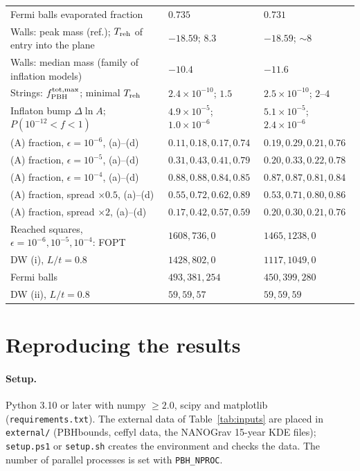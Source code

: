 \documentclass[aps,prd,onecolumn,superscriptaddress,nofootinbib,floatfix]{revtex4-2}
\newcommand{\fpbh}{f_{\rm PBH}}
\newcommand{\Treh}{T_{\rm reh}}
\newcommand{\code}[1]{\texttt{#1}}
\begin{document}
\begin{table}[htbp]
\begin{ruledtabular}
\begin{tabular}{lll}
Fermi balls evaporated fraction & $0.735$ & $0.731$ \\
Walls: peak mass (ref.); $\Treh$ of entry into the plane & $-18.59$; $8.3$ & $-18.59$; $\sim8$ \\
Walls: median mass (family of inflation models) & $-10.4$ & $-11.6$ \\
Strings: $\fpbh^{\rm tot,max}$; minimal $\Treh$ & $2.4\times10^{-10}$; $1.5$ & $2.5\times10^{-10}$; $2$--$4$ \\
Inflaton bump $\Delta\ln A$; $P(10^{-12}<f<1)$ & $4.9\times10^{-5}$; $1.0\times10^{-6}$ & $5.1\times10^{-5}$; $2.4\times10^{-6}$ \\
(A) fraction, $\epsilon=10^{-6}$, (a)--(d) & $0.11, 0.18, 0.17, 0.74$ & $0.19, 0.29, 0.21, 0.76$ \\
(A) fraction, $\epsilon=10^{-5}$, (a)--(d) & $0.31, 0.43, 0.41, 0.79$ & $0.20, 0.33, 0.22, 0.78$ \\
(A) fraction, $\epsilon=10^{-4}$, (a)--(d) & $0.88, 0.88, 0.84, 0.85$ & $0.87, 0.87, 0.81, 0.84$ \\
(A) fraction, spread $\times0.5$, (a)--(d) & $0.55, 0.72, 0.62, 0.89$ & $0.53, 0.71, 0.80, 0.86$ \\
(A) fraction, spread $\times2$, (a)--(d) & $0.17, 0.42, 0.57, 0.59$ & $0.20, 0.30, 0.21, 0.76$ \\
Reached squares, $\epsilon=10^{-6},10^{-5},10^{-4}$: FOPT & $1608, 736, 0$ & $1465, 1238, 0$ \\
\quad DW (i), $L/t=0.8$ & $1428, 802, 0$ & $1117, 1049, 0$ \\
\quad Fermi balls & $493, 381, 254$ & $450, 399, 280$ \\
\quad DW (ii), $L/t=0.8$ & $59, 59, 57$ & $59, 59, 59$ \\
\end{tabular}
\end{ruledtabular}
\end{table}

\section{Reproducing the results}\label{sec:repro}

\paragraph*{Setup.}
Python 3.10 or later with numpy $\ge2.0$, scipy and matplotlib (\code{requirements.txt}). The external data of Table~\ref{tab:inputs} are placed in \code{external/} (PBHbounds, ceffyl data, the NANOGrav 15-year KDE files); \code{setup.ps1} or \code{setup.sh} creates the environment and checks the data. The number of parallel processes is set with \code{PBH\_NPROC}.
\end{document}
